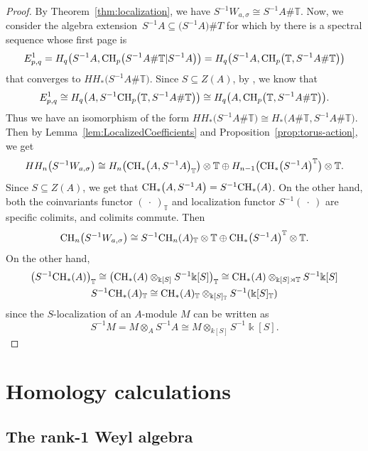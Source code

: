 \documentclass[pdftex]{sigma}
\newcommand{\B}[1]{\mathbb{#1}}
\newcommand{\CH}{{\rm CH}}
\numberwithin{equation}{section}
\begin{document}
\begin{proof}
 By Theorem~\ref{thm:localization}, we have $S^{-1}W_{a,\sigma} \cong S^{-1}A\# \B{T}$. Now, we
 consider the algebra extension~$S^{-1}A\subseteq \bigl(S^{-1}A\bigr)\# T$ for which by \cite{KaygSutl20}
 there is a spectral sequence whose first page is
 \[ E^1_{p,q} = H_q\bigl(S^{-1}A,\CH_p\bigl(S^{-1}A\# \B{T}|S^{-1}A\bigr)\bigr) = H_q\bigl(S^{-1}A,\CH_p\bigl(\B{T},S^{-1}A\# \B{T}\bigr)\bigr) \]
 that converges to $HH_*\bigl(S^{-1}A\# \B{T}\bigr)$. Since $S\subseteq Z(A)$, by
 \cite{Brylinski:Localizations}, we know that
 \[ E^1_{p,q}\cong H_q\bigl(A,S^{-1}\CH_p\bigl(\B{T}, S^{-1}A\# \B{T}\bigr)\bigr)\cong H_q\bigl(A,\CH_p\bigl(\B{T},S^{-1}A\# \B{T}\bigr)\bigr). \] Thus we have an isomorphism of the form $HH_*\bigl(S^{-1}A\# \B{T}\bigr)\cong
 H_*\bigl(A\# \B{T},S^{-1}A\# \B{T}\bigr)$. Then by Lemma~\ref{lem:LocalizedCoefficients} and Proposition~\ref{prop:torus-action}, we get
 \[ HH_n\bigl(S^{-1}W_{a,\sigma}\bigr)\cong H_n\bigl(\CH_*\bigl(A,S^{-1}A\bigr)_{\B{T}}\bigr)\otimes\B{T} \oplus
 H_{n-1}\bigl(\CH_*\bigl(S^{-1}A\bigr)^{\B{T}}\bigr)\otimes\B{T}.
 \] Since $S\subseteq Z(A)$, we get that $\CH_*\bigl(A,S^{-1}A\bigr) = S^{-1}\CH_*(A)$. On the other hand,
 both the coinvariants functor $(\ \cdot\ )_{\B{T}}$ and localization functor $S^{-1}(\ \cdot\ )$ are
 specific colimits, and colimits commute. Then
 \[ \CH_n\bigl(S^{-1}W_{a,\sigma}\bigr)\cong S^{-1}\CH_n(A)_{\B{T}}\otimes\B{T} \oplus \CH_*\bigl(S^{-1}A\bigr)^{\B{T}}\otimes\B{T}.
 \]
 On the other hand,
 \begin{gather*}
 \bigl(S^{-1}\CH_*(A)\bigr)_{\B{T}} \cong \bigl(\CH_*(A)\otimes_{\Bbbk[S]} S^{-1}\Bbbk[S]\bigr)_{\B{T}} \cong \CH_*(A)\otimes_{\Bbbk[S]\rtimes\B{T}} S^{-1}\Bbbk[S] \\ S^{-1}\CH_*(A)_{\B{T}} \cong \CH_*(A)_{\B{T}}\otimes_{\Bbbk[S]_{\B{T}}} S^{-1}(\Bbbk[S]_{\B{T}})
 \end{gather*}
 since the $S$-localization of an $A$-module $M$ can be written as
 \[ S^{-1}M = M\otimes_A S^{-1}A \cong M\otimes_{k[S]} S^{-1}\Bbbk[S].\tag*{\qed}
 \]\renewcommand{\qed}{}
\end{proof}

\section{Homology calculations}\label{sect:Calculations}

\subsection{The rank-1 Weyl algebra}\label{sect:WeylAlgebra}
\end{document}

